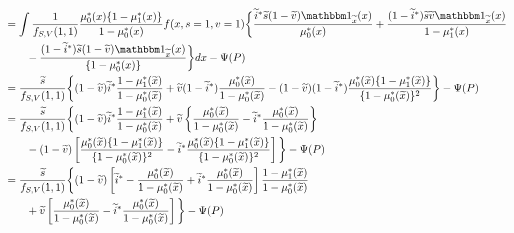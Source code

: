 \begin{appendix}
\begin{align*}
   &= \int \dfrac{1}{f_{S,V}(1, 1)} \dfrac{\mu^*_0(x)\{1 - \mu^*_1(x)\}}{1 - \mu^*_0(x)}f(x, s=1, v=1) \bigg\{\dfrac{\widetilde{i}^*\widetilde{s}(1-\widetilde{v})\mathbbm 1_{\widetilde{x}}(x)}{\mu^*_0(x)} + \dfrac{(1-\widetilde{i}^*)\widetilde{s}\widetilde{v}\mathbbm 1_{\widetilde{x}}(x)}{1 - \mu^*_1(x)} \\
   &\qquad - \dfrac{(1-\widetilde{i}^*)\widetilde{s}(1-\widetilde{v})\mathbbm 1_{\widetilde{x}}(x)}{\{1 - \mu^*_0(x)\}}\bigg\} dx - \Psi(P) \\
   &=\dfrac{\widetilde s}{f_{S,V}(1, 1)}  \bigg\{(1 - \widetilde v)\widetilde i^*\dfrac{1 - \mu^*_1(\widetilde x)}{1 - \mu^*_0(\widetilde x)} + \widetilde v (1 - \widetilde i^*) \dfrac{\mu^*_0(\widetilde x)}{1 - \mu^*_0(\widetilde x)} -  (1 - \widetilde v) (1 - \widetilde i^*)\dfrac{\mu^*_0(\widetilde x)\{1 - \mu^*_1(\widetilde x)\}}{\{1 - \mu^*_0(\widetilde x)\}^2}  \bigg\}  - \Psi(P) \\
   &=\dfrac{\widetilde s}{f_{S,V}(1, 1)}  \bigg\{(1 - \widetilde v)\widetilde i^*\dfrac{1 - \mu^*_1(\widetilde x)}{1 - \mu^*_0(\widetilde x)} + \widetilde v \left\{\dfrac{\mu^*_0(\widetilde x)}{1 - \mu^*_0(\widetilde x)} - \widetilde i^* \dfrac{\mu^*_0(\widetilde x)}{1 - \mu^*_0(\widetilde x)}\right\} \\
   &\qquad -  (1 - \widetilde v) \left[\dfrac{\mu^*_0(\widetilde x)\{1 - \mu^*_1(\widetilde x)\}}{\{1 - \mu^*_0(\widetilde x)\}^2} - \widetilde i^*\dfrac{\mu^*_0(\widetilde x)\{1 - \mu^*_1(\widetilde x)\}}{\{1 - \mu^*_0(\widetilde x)\}^2}\right]  \bigg\}  - \Psi(P) \\
   &=\dfrac{\widetilde s}{f_{S,V}(1, 1)}  \bigg\{(1 - \widetilde v) \left[\widetilde i^* - \dfrac{\mu^*_0(\widetilde x)}{1 - \mu^*_0(\widetilde x)}  + \widetilde i^*\dfrac{\mu^*_0(\widetilde x)}{1 - \mu^*_0(\widetilde x)}\right]\dfrac{1 - \mu^*_1(\widetilde x)}{1 - \mu^*_0(\widetilde x)}\\
   &\qquad   + \widetilde v \left[\dfrac{\mu^*_0(\widetilde x)}{1 - \mu^*_0(\widetilde x)} - \widetilde i^* \dfrac{\mu^*_0(\widetilde x)}{1 - \mu^*_0(\widetilde x)}\right] \bigg\}  - \Psi(P) \\

\end{align*}
\end{appendix}
